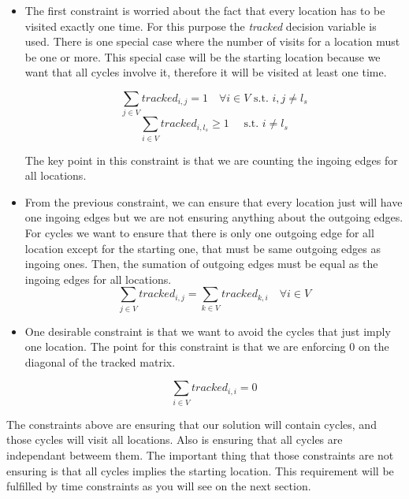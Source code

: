 \documentclass[]{report}
\begin{document}
\begin{itemize}
	\item The first constraint is worried about the fact that every location has to be visited exactly one time. For this purpose the \textit{tracked} decision variable is used. There is one special case where the number of visits for a location must be one or more. This special case will be the starting location because we want that all cycles involve it, therefore it will be visited at least one time.

	$$\sum\limits_{j \in V} tracked_{i,j} = 1 \quad \forall i \in V \text{ s.t. } i,j \neq l_{s}$$
	$$\sum\limits_{i \in V} tracked_{i,l_{s}} \geq 1 \quad \text{ s.t. } i \neq l_{s}$$
	
	The key point in this constraint is that we are counting the ingoing edges for all locations. 
	
	
	\item From the previous constraint, we can ensure that every location just will have one ingoing edges but we are not ensuring anything about the outgoing edges. For cycles we want to ensure that there is only one outgoing edge for all location except for the starting one, that must be same outgoing edges as ingoing ones. Then, the sumation of outgoing edges must be equal as the ingoing edges for all locations.
	$$\sum\limits_{j \in V} tracked_{i,j} = \sum\limits_{k \in V} tracked_{k,i} \quad \forall i \in V $$
	$$ $$

	
	\item One desirable constraint is that we want to avoid the cycles that just imply one location. The point for this constraint is that we are enforcing 0 on the diagonal of the tracked matrix. 

	$$ \sum\limits_{i \in V} tracked_{i,i} = 0 $$
	$$ $$

\end{itemize}

The constraints above are ensuring that our solution will contain cycles, and those cycles will visit all locations. Also is ensuring that all cycles are independant betweem them. The important thing that those constraints are not ensuring is that all cycles implies the starting location. This requirement will be fulfilled by time constraints as you will see on the next section.
\end{document}
